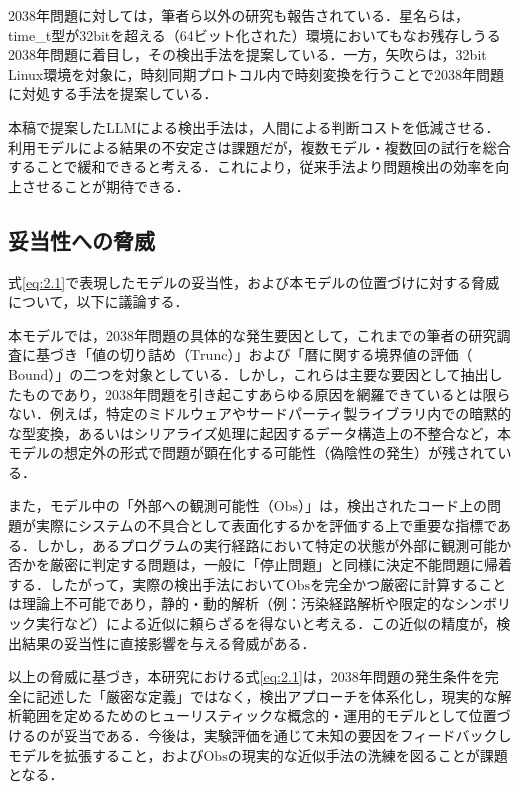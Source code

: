 \documentclass[submit,techrep,noauthor]{ipsj}
\begin{document}
2038年問題に対しては，筆者ら以外の研究も報告されている．星名らは，time\_t型が32bitを超える（64ビット化された）環境においてもなお残存しうる2038年問題に着目し，その検出手法を提案している\cite{ref13}．一方，矢吹らは，32bit Linux環境を対象に，時刻同期プロトコル内で時刻変換を行うことで2038年問題に対処する手法を提案している\cite{ref14}．

本稿で提案したLLMによる検出手法は，人間による判断コストを低減させる．利用モデルによる結果の不安定さは課題だが，複数モデル・複数回の試行を総合することで緩和できると考える．これにより，従来手法より問題検出の効率を向上させることが期待できる．

\subsection{妥当性への脅威}
\label{sec:妥当性への脅威}

式\ref{eq:2.1}で表現したモデルの妥当性，および本モデルの位置づけに対する脅威について，以下に議論する．

本モデルでは，2038年問題の具体的な発生要因として，これまでの筆者の研究調査に基づき「値の切り詰め（$\mathrm{Trunc}$）」および「暦に関する境界値の評価（$\mathrm{Bound}$）」の二つを対象としている．しかし，これらは主要な要因として抽出したものであり，2038年問題を引き起こすあらゆる原因を網羅できているとは限らない．例えば，特定のミドルウェアやサードパーティ製ライブラリ内での暗黙的な型変換，あるいはシリアライズ処理に起因するデータ構造上の不整合など，本モデルの想定外の形式で問題が顕在化する可能性（偽陰性の発生）が残されている．

また，モデル中の「外部への観測可能性（$\mathrm{Obs}$）」は，検出されたコード上の問題が実際にシステムの不具合として表面化するかを評価する上で重要な指標である．しかし，あるプログラムの実行経路において特定の状態が外部に観測可能か否かを厳密に判定する問題は，一般に「停止問題」\cite{ref15}と同様に決定不能問題に帰着する．したがって，実際の検出手法において$\mathrm{Obs}$を完全かつ厳密に計算することは理論上不可能であり，静的・動的解析（例：汚染経路解析や限定的なシンボリック実行など）\cite{ref16}による近似に頼らざるを得ないと考える．この近似の精度が，検出結果の妥当性に直接影響を与える脅威がある．

以上の脅威に基づき，本研究における式\ref{eq:2.1}は，2038年問題の発生条件を完全に記述した「厳密な定義」ではなく，検出アプローチを体系化し，現実的な解析範囲を定めるためのヒューリスティックな概念的・運用的モデルとして位置づけるのが妥当である．今後は，実験評価を通じて未知の要因をフィードバックしモデルを拡張すること，および$\mathrm{Obs}$の現実的な近似手法の洗練を図ることが課題となる．
\end{document}
